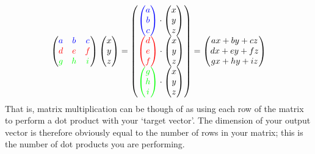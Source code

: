 \documentclass[a4paper,openany,11pt]{book}
\begin{document}
					\begin{equation}
						\begin{pmatrix}
							\color{blue} a & \color{blue} b & \color{blue} c
							\\
							\color{red} d & \color{red} e & \color{red} f
							\\
							\color{green} g & \color{green} h & \color{green} i
						\end{pmatrix} \begin{pmatrix} x \\ y \\ z \end{pmatrix} = \begin{pmatrix} {\color{blue}\begin{pmatrix} a \\ b \\ c\end{pmatrix}} \cdot\begin{pmatrix} x \\ y \\ z \end{pmatrix}\\{\color{red}\begin{pmatrix} d \\ e \\ f\end{pmatrix}} \cdot\begin{pmatrix} x \\ y \\ z \end{pmatrix}\\{\color{green}\begin{pmatrix} g \\ h \\ i\end{pmatrix}} \cdot\begin{pmatrix} x \\ y \\ z \end{pmatrix} \end{pmatrix} 
						 = \begin{pmatrix} ax + by + cz \\ dx + ey + fz \\ gx + hy + iz \end{pmatrix}
					\end{equation}
					That is, matrix multiplication can be though of as using each row of the matrix to perform a dot product with your `target vector'. The dimension of your output vector is therefore obviously equal to the number of rows in your matrix; this is the number of dot products you are performing.
				
\end{document}
